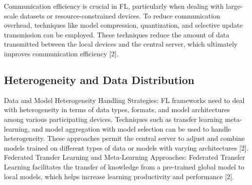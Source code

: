 Communication efficiency is crucial in FL, particularly when dealing with large-scale datasets or resource-constrained devices. To reduce communication overhead, techniques like model compression, quantization, and selective update transmission can be employed. These techniques reduce the amount of data transmitted between the local devices and the central server, which ultimately improves communication efficiency [2].

\subsection{Heterogeneity and Data Distribution}
Data and Model Heterogeneity Handling Strategies:
FL frameworks need to deal with heterogeneity in terms of data types, formats, and model architectures among various participating devices. Techniques such as transfer learning meta-learning, and model aggregation with model selection can be used to handle heterogeneity. These approaches permit the central server to adjust and combine models trained on different types of data or models with varying architectures [2].
Federated Transfer Learning and Meta-Learning Approaches:
Federated Transfer Learning facilitates the transfer of knowledge from a pre-trained global model to local models, which helps increase learning productivity and performance [2].

